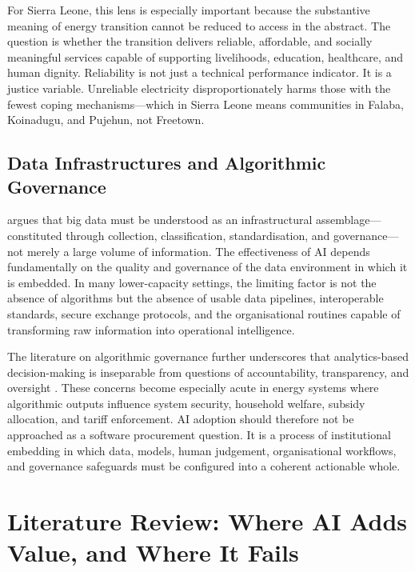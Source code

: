 \documentclass[preprint,12pt]{elsarticle}
\begin{document}
For Sierra Leone, this lens is especially important because
the substantive meaning of energy transition cannot be reduced
to access in the abstract. The question is whether the
transition delivers reliable, affordable, and socially
meaningful services capable of supporting livelihoods,
education, healthcare, and human dignity. Reliability is not
just a technical performance indicator. It is a justice
variable. Unreliable electricity disproportionately harms
those with the fewest coping mechanisms---which in Sierra
Leone means communities in Falaba, Koinadugu, and Pujehun,
not Freetown.

\subsection{Data Infrastructures and Algorithmic Governance}

\citet{Kitchin2014} argues that big data must be understood as
an infrastructural assemblage---constituted through collection,
classification, standardisation, and governance---not merely a
large volume of information. The effectiveness of AI depends
fundamentally on the quality and governance of the data
environment in which it is embedded. In many lower-capacity
settings, the limiting factor is not the absence of algorithms
but the absence of usable data pipelines, interoperable
standards, secure exchange protocols, and the organisational
routines capable of transforming raw information into
operational intelligence.

The literature on algorithmic governance further underscores
that analytics-based decision-making is inseparable from
questions of accountability, transparency, and oversight
\cite{Barocas2019}. These concerns become especially acute
in energy systems where algorithmic outputs influence system
security, household welfare, subsidy allocation, and tariff
enforcement. AI adoption should therefore not be approached
as a software procurement question. It is a process of
institutional embedding in which data, models, human
judgement, organisational workflows, and governance
safeguards must be configured into a coherent actionable whole.

\section{Literature Review: Where AI Adds Value,
and Where It Fails}
\label{sec:lit}
\end{document}
